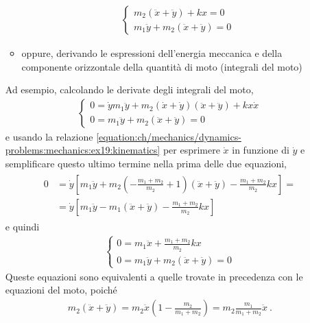 \documentclass[letterpaper,10pt,italian]{jupyterBook}
\begin{document}
\begin{enumerate}
\begin{itemize}
\begin{equation*}
\begin{split}\begin{cases}
         m_2 (\ddot{x} + \ddot{y}) + k x = 0 \\
         m_1 \ddot{y} + m_2 (\ddot{x} + \ddot{y}) = 0
      \end{cases}\end{split}
\end{equation*}
\item {} 
\sphinxAtStartPar
oppure, derivando le espressioni dell’energia meccanica e della componente orizzontale della quantità di moto (integrali del moto)

\end{itemize}

\sphinxAtStartPar
Ad esempio, calcolando le derivate degli integrali del moto,
\begin{equation*}
\begin{split}\begin{cases}
     0 = \dot{y} m_1 \ddot{y} + m_2 (\dot{x} + \dot{y}) (\ddot{x} + \ddot{y}) + k x \dot{x} \\
     0 = m_1 \ddot{y} + m_2 ( \ddot{x} + \ddot{y} ) = 0
    \end{cases}\end{split}
\end{equation*}
\sphinxAtStartPar
e usando la relazione \eqref{equation:ch/mechanics/dynamics-problems:mechanics:ex19:kinematics} per esprimere \(\dot{x}\) in funzione di \(\dot{y}\) e semplificare questo ultimo termine nella prima delle due equazioni,
\begin{equation*}
\begin{split}\begin{aligned}
      0 & = \dot{y} \left[ m_1 \ddot{y} + m_2 \left( - \frac{m_1+m_2}{m_2} + 1\right) \left( \ddot{x} + \ddot{y} \right) - \frac{m_1 + m_2}{m_2} k x \right] = \\
        & = \dot{y} \left[ m_1 \ddot{y} - m_1 (\ddot{x} + \ddot{y}) - \frac{m_1 + m_2}{m_2} k x \right]
    \end{aligned}\end{split}
\end{equation*}
\sphinxAtStartPar
e quindi
\begin{equation*}
\begin{split}\begin{cases}
      0 = m_1 \ddot{x} + \frac{m_1 + m_2}{m_2} k x \\
      0 = m_1 \ddot{y} + m_2 ( \ddot{x} + \ddot{y} ) = 0
    \end{cases}\end{split}
\end{equation*}
\sphinxAtStartPar
{} Queste equazioni sono equivalenti a quelle trovate in precedenza con le equazioni del moto, poiché
\begin{equation*}
\begin{split}m_2 (\ddot{x} + \ddot{y}) = m_2 \ddot{x} \left( 1 - \frac{m_2}{m_1 + m_2} \right) = m_2 \frac{m_1}{m_1 + m_2} \ddot{x} \ .\end{split}
\end{equation*}
\end{enumerate}
\end{document}
